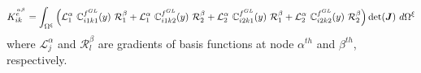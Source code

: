 \documentclass[25pt, a0paper,
portrait,
margin=2mm, 
innermargin=2mm, 
blockverticalspace=7mm, %
colspace=2mm, %
subcolspace=0mm]{tikzposter}
\begin{document}
{\begin{minipage}{0.54\textwidth}
\begin{mdframed}
\begin{align*}
				K^{\stackrel{\alpha\beta}{e\ \ }}_{ik} = 
				\int_{\Omega^{\xi}}
				\left(
				\mathcal{L}^{\alpha}_{1} \ \mathbb{C}_{i1k1}^{f^{GL}}(y) \ \mathcal{R}^{\beta}_{1} +
				\mathcal{L}^{\alpha}_{1} \ \mathbb{C}_{i1k2}^{f^{GL}}(y) \ \mathcal{R}^{\beta}_{2} +
				\mathcal{L}^{\alpha}_{2} \ \mathbb{C}_{i2k1}^{f^{GL}}(y) \ \mathcal{R}^{\beta}_{1} +
				\mathcal{L}^{\alpha}_{2} \ \mathbb{C}_{i2k2}^{f^{GL}}(y) \ \mathcal{R}^{\beta}_{2}
				\right)
				\det({\boldsymbol{\mathnormal J}}) \ d\Omega^{\xi}
			\end{align*}
			where $\mathcal{L}^{\alpha}_{j}$ and $\mathcal{R}^{\beta}_{l}$ are gradients of basis functions at node $\alpha^{th}$ and $\beta^{th}$, respectively.
		\end{mdframed}
	\end{minipage}
}
\end{document}
